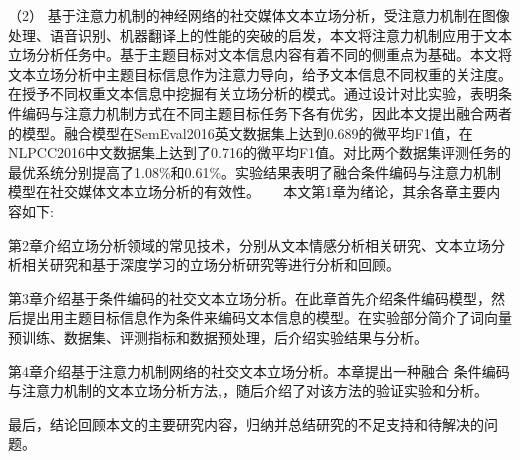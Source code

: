 （2） 基于注意力机制的神经网络的社交媒体文本立场分析，受注意力机制在图像处理、语音识别、机器翻译上的性能的突破的启发，本文将注意力机制应用于文本立场分析任务中。基于主题目标对文本信息内容有着不同的侧重点为基础。本文将文本立场分析中主题目标信息作为注意力导向，给予文本信息不同权重的关注度。在授予不同权重文本信息中挖掘有关立场分析的模式。通过设计对比实验，表明条件编码与注意力机制方式在不同主题目标任务下各有优劣，因此本文提出融合两者的模型。融合模型在SemEval2016英文数据集上达到0.689的微平均F1值，在NLPCC2016中文数据集上达到了0.716的微平均F1值。对比两个数据集评测任务的最优系统分别提高了1.08\%和0.61\%。实验结果表明了融合条件编码与注意力机制模型在社交媒体文本立场分析的有效性。
　
本文第1章为绪论，其余各章主要内容如下:

第2章介绍立场分析领域的常见技术，分别从文本情感分析相关研究、文本立场分析相关研究和基于深度学习的立场分析研究等进行分析和回顾。

第3章介绍基于条件编码的社交文本立场分析。在此章首先介绍条件编码模型，然后提出用主题目标信息作为条件来编码文本信息的模型。在实验部分简介了词向量预训练、数据集、评测指标和数据预处理，后介绍实验结果与分析。

第4章介绍基于注意力机制网络的社交文本立场分析。本章提出一种融合
条件编码与注意力机制的文本立场分析方法,，随后介绍了对该方法的验证实验和分析。

最后，结论回顾本文的主要研究内容，归纳并总结研究的不足支持和待解决的问题。


